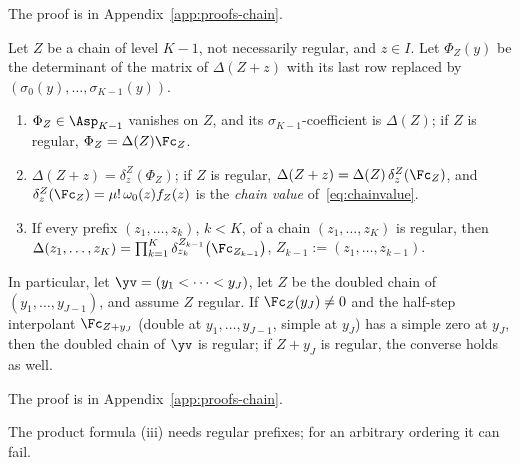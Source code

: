 The proof is in Appendix~\ref{app:proofs-chain}.

\begin{lemma}\label{lem:Delta}
Let $Z$ be a chain of level $K-1$, not necessarily regular, and $z\in I$. Let $\Phi_Z(y)$ be the determinant of the
matrix of $\Delta(Z+z)$ with its last row replaced by $(\sigma_0(y),\dots,\sigma_{K-1}(y))$.
\begin{enumerate}[label=(\roman*),leftmargin=2em]
\item $\Phi_Z\in\Asp_{K-1}$ vanishes on $Z$, and its $\sigma_{K-1}$-coefficient is $\Delta(Z)$; if $Z$ is regular,
$\Phi_Z=\Delta(Z)\Fc_Z$.
\item $\Delta(Z+z)=\delta^Z_z(\Phi_Z)$; if $Z$ is regular, $\Delta(Z+z)=\Delta(Z)\,\delta^Z_z(\Fc_Z)$, and
$\delta^Z_z(\Fc_Z)=\mu!\,\omega_0(z)f_Z(z)$ is the \emph{chain value} of~\eqref{eq:chainvalue}.
\item If every prefix $(z_1,\dots,z_k)$, $k<K$, of a chain $(z_1,\dots,z_K)$ is regular, then
$\Delta(z_1,\dots,z_K)=\prod_{k=1}^{K}\delta^{Z_{k-1}}_{z_k}\bigl(\Fc_{Z_{k-1}}\bigr)$, $Z_{k-1}:=(z_1,\dots,z_{k-1})$.
\end{enumerate}
In particular, let $\yv=(y_1<\dots<y_J)$, let $Z$ be the doubled chain of $(y_1,\dots,y_{J-1})$, and assume $Z$
regular. If $\Fc_Z(y_J)\ne0$ and the half-step interpolant $\Fc_{Z+y_J}$ (double at $y_1,\dots,y_{J-1}$, simple at
$y_J$) has a simple zero at $y_J$, then the doubled chain of $\yv$ is regular; if $Z+y_J$ is regular, the converse
holds as well.
\end{lemma}

The proof is in Appendix~\ref{app:proofs-chain}.

The product formula (iii) needs regular prefixes; for an arbitrary ordering it can fail.

